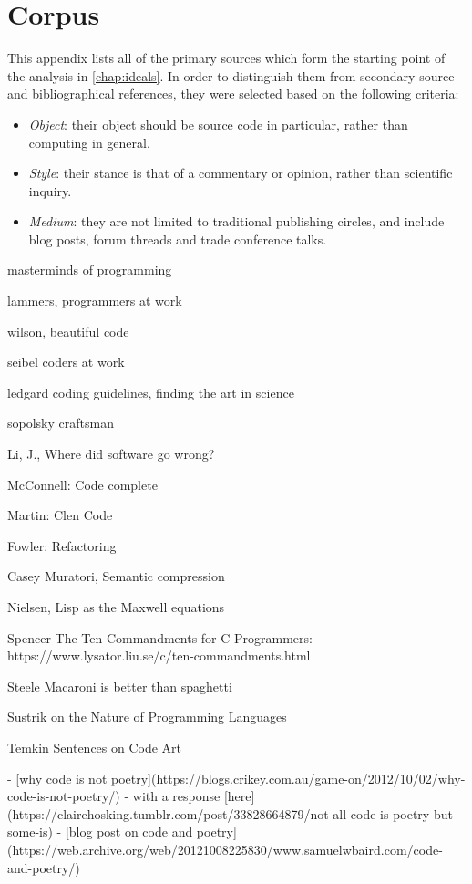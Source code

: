 \chapter{Corpus}
\label{appendix:corpus}

This appendix lists all of the primary sources which form the starting point of the analysis in \ref{chap:ideals}. In order to distinguish them from secondary source and bibliographical references, they were selected based on the following criteria:

\begin{itemize}
    \item \emph{Object}: their object should be source code in particular, rather than computing in general.
    \item \emph{Style}: their stance is that of a commentary or opinion, rather than scientific inquiry.
    \item \emph{Medium}: they are not limited to traditional publishing circles, and include blog posts, forum threads and trade conference talks.
\end{itemize}

masterminds of programming

lammers, programmers at work

wilson, beautiful code

seibel coders at work

ledgard coding guidelines, finding the art in science

sopolsky craftsman

Li, J., Where did software go wrong?

McConnell: Code complete

Martin: Clen Code

Fowler: Refactoring

Casey Muratori, Semantic compression

Nielsen, Lisp as the Maxwell equations

Spencer The Ten Commandments for C Programmers: https://www.lysator.liu.se/c/ten-commandments.html

Steele Macaroni is better than spaghetti

Sustrik on the Nature of Programming Languages

Temkin Sentences on Code Art


- [why code is not poetry](https://blogs.crikey.com.au/game-on/2012/10/02/why-code-is-not-poetry/) - with a response [here](https://clairehosking.tumblr.com/post/33828664879/not-all-code-is-poetry-but-some-is)
- [blog post on code and poetry](https://web.archive.org/web/20121008225830/www.samuelwbaird.com/code-and-poetry/)

